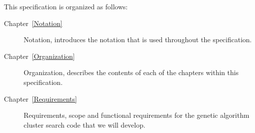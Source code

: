 \label{Organization}

This specification is organized as follows:

\begin{description}

  \item[Chapter~\ref{Notation}] Notation, introduces the notation that is used
    throughout the specification.


  \item[Chapter~\ref{Organization}] Organization, describes the contents of
    each of the chapters within this specification.

  \item[Chapter~\ref{Requirements}] Requirements, scope and functional requirements for 
    the genetic algorithm cluster search code that we will develop.

\end{description}
